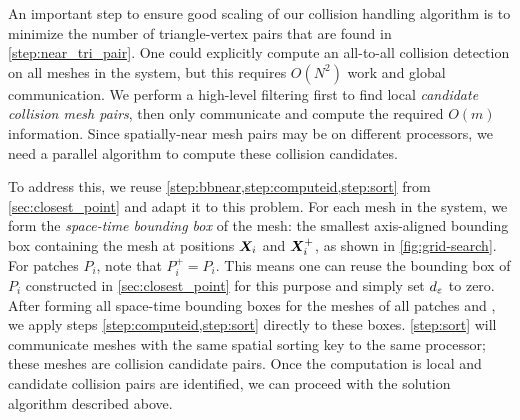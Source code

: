 An important step to ensure good scaling of our collision handling algorithm is
to minimize the number of triangle-vertex pairs that are found in
\cref{step:near_tri_pair}. One could explicitly compute an
all-to-all collision detection on all meshes in the system, but this requires
$O(N^2)$ work and global communication.
We perform a high-level filtering first to find local \textit{candidate collision
mesh pairs}, then only communicate and compute the required $O(m)$ information.
Since spatially-near mesh pairs may be on different 
processors, we need a parallel algorithm to compute these collision candidates.

To address this, we reuse \cref{step:bbnear,step:computeid,step:sort} from
\cref{sec:closest_point} and adapt it to this problem. For each mesh in the
system, we form the \textit{space-time
  bounding box} of the mesh: the smallest axis-aligned bounding box
containing the mesh at positions ${\bm{X}}_i$ and ${\bm{X}}_i^+$, as shown in
\cref{fig:grid-search}.  For patches $P_i$, note that $P_i^+ = P_i$.
This means one can reuse the bounding box of $P_i$ constructed in
\cref{sec:closest_point} for this purpose and simply set $d_\varepsilon$ to zero.
After forming all space-time bounding boxes for the meshes of all patches and \rbcs, we
apply steps \cref{step:computeid,step:sort} directly to these boxes.
\cref{step:sort} will communicate meshes with the same spatial sorting key to
the same processor; these meshes are collision candidate pairs.
Once the computation is local and candidate collision pairs are identified, we
can proceed with the
\ncp solution algorithm described above.


